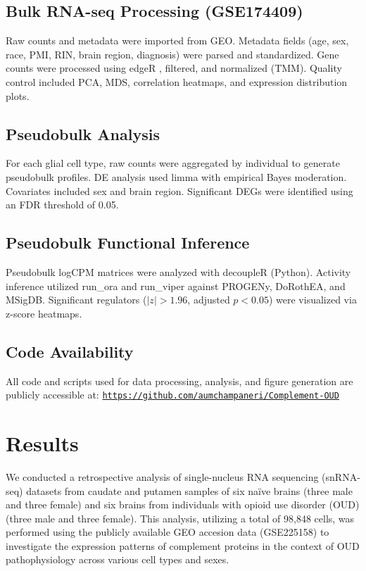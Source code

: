 \documentclass[10pt,letterpaper]{article}
\begin{document}
\subsection*{Bulk RNA-seq Processing (GSE174409)}
Raw counts and metadata were imported from GEO. Metadata fields (age, sex, race, PMI, RIN, brain region, diagnosis) were parsed and standardized. Gene counts were processed using edgeR \cite{Robinson2010edgeR}, filtered, and normalized (TMM). Quality control included PCA, MDS, correlation heatmaps, and expression distribution plots.

\subsection*{Pseudobulk Analysis}
For each glial cell type, raw counts were aggregated by individual to generate pseudobulk profiles. DE analysis used limma \cite{Ritchie2015limma} with empirical Bayes moderation. Covariates included sex and brain region. Significant DEGs were identified using an FDR threshold of 0.05.

\subsection*{Pseudobulk Functional Inference}
Pseudobulk logCPM matrices were analyzed with decoupleR (Python). Activity inference utilized run\_ora and run\_viper against PROGENy, DoRothEA, and MSigDB. Significant regulators ($|z| > 1.96$, adjusted $p < 0.05$) were visualized via z-score heatmaps.

\subsection*{Code Availability}
All code and scripts used for data processing, analysis, and figure generation are publicly accessible at: \texttt{\href{[https://github.com/aumchampaneri/Complement-OUD}{https://github.com/aumchampaneri/Complement-OUD}}



\newpage

\section*{Results}
We conducted a retrospective analysis of single-nucleus RNA sequencing (snRNA-seq) datasets from caudate and putamen samples of six naïve brains (three male and three female) and six brains from individuals with opioid use disorder (OUD) (three male and three female). This analysis, utilizing a total of 98,848 cells, was performed using the publicly available GEO accesion data (GSE225158) to investigate the expression patterns of complement proteins in the context of OUD pathophysiology across various cell types and sexes.
\end{document}
